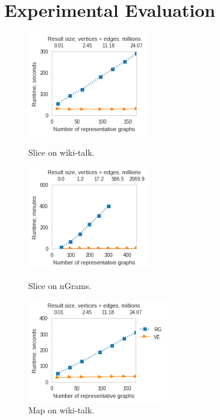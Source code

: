 \section{Experimental Evaluation}
\label{sec:exp}

\begin{figure}[b]
\vspace{-0.2in}
\centering
\begin{minipage}{2.1in}
\centering
\includegraphics[width=2.1in]{figs/slice_wikitalk_build13.png}
\vspace{-0.2in}
\caption{Slice on wiki-talk.}
\label{fig:slicewiki}
\vspace{-0.1in}
\end{minipage}
\begin{minipage}{2.1in}
\centering
\includegraphics[width=2.1in]{figs/slice_ngrams_build13.png}
\vspace{-0.2in}
\caption{Slice on nGrams.}
\label{fig:slicengrams}
\vspace{-0.1in}
\end{minipage}
\begin{minipage}{2.1in}
\centering
\includegraphics[width=2.4in]{figs/project_wikitalk_build13.png}
\vspace{-0.2in}
\caption{Map on wiki-talk.}
\label{fig:project}
\vspace{-0.1in}
\end{minipage}
\end{figure}

